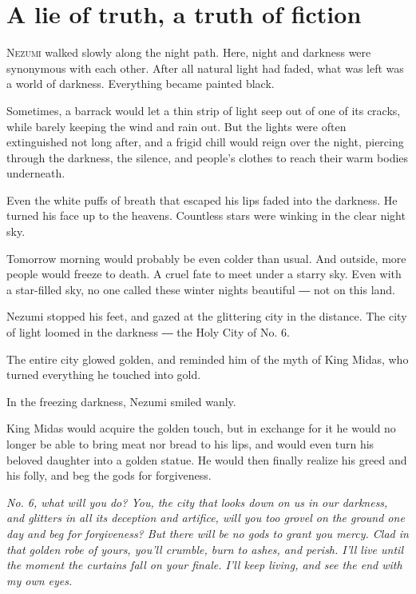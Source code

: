 
\chapter{A lie of truth, a truth of fiction}


\lettrine{N}{ezumi} walked slowly along the night path. Here, night and darkness were
synonymous with each other. After all natural light had faded, what was
left was a world of darkness. Everything became painted black.

Sometimes, a barrack would let a thin strip of light seep out of one of
its cracks, while barely keeping the wind and rain out. But the lights
were often extinguished not long after, and a frigid chill would reign
over the night, piercing through the darkness, the silence, and people's
clothes to reach their warm bodies underneath.~

Even the white puffs of breath that escaped his lips faded into the
darkness. He turned his face up to the heavens. Countless stars were
winking in the clear night sky.

Tomorrow morning would probably be even colder than usual. And outside,
more people would freeze to death. A cruel fate to meet under a starry
sky. Even with a star-filled sky, no one called these winter nights
beautiful ― not on this land.

Nezumi stopped his feet, and gazed at the glittering city in the
distance. The city of light loomed in the darkness ― the Holy City of
No. 6.

The entire city glowed golden, and reminded him of the myth of King
Midas, who turned everything he touched into gold.

In the freezing darkness, Nezumi smiled wanly.

King Midas would acquire the golden touch, but in exchange for it he
would no longer be able to bring meat nor bread to his lips, and would
even turn his beloved daughter into a golden statue. He would then
finally realize his greed and his folly, and beg the gods for
forgiveness.

\emph{No. 6, what will you do? You, the city that looks down on us in our
darkness, and glitters in all its deception and artifice, will you too
grovel on the ground one day and beg for forgiveness? But there will be
no gods to grant you mercy. Clad in that golden robe of yours, you'll
crumble, burn to ashes, and perish. I'll live until the moment the
curtains fall on your finale. I'll keep living, and see the end with my
own eyes.}

